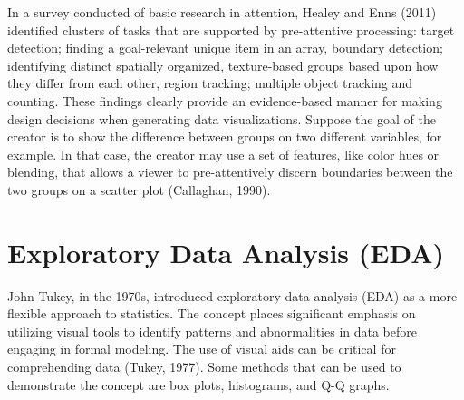 \documentclass[print]{nuthesis}
\begin{document}
In a survey conducted of basic research in attention, Healey and Enns (2011) identified clusters of tasks that are supported by pre-attentive processing: target detection; finding a goal-relevant unique item in an array, boundary detection; identifying distinct spatially organized, texture-based groups based upon how they differ from each other, region tracking; multiple object tracking and counting.
These findings clearly provide an evidence-based manner for making design decisions when generating data visualizations.
Suppose the goal of the creator is to show the difference between groups on two different variables, for example.
In that case, the creator may use a set of features, like color hues or blending, that allows a viewer to pre-attentively discern boundaries between the two groups on a scatter plot (Callaghan, 1990).

\hypertarget{exploratory-data-analysis-eda}{%
\section{Exploratory Data Analysis (EDA)}\label{exploratory-data-analysis-eda}}

John Tukey, in the 1970s, introduced exploratory data analysis (EDA) as a more flexible approach to statistics.
The concept places significant emphasis on utilizing visual tools to identify patterns and abnormalities in data before engaging in formal modeling.
The use of visual aids can be critical for comprehending data (Tukey, 1977).
Some methods that can be used to demonstrate the concept are box plots, histograms, and Q-Q graphs.
\end{document}
